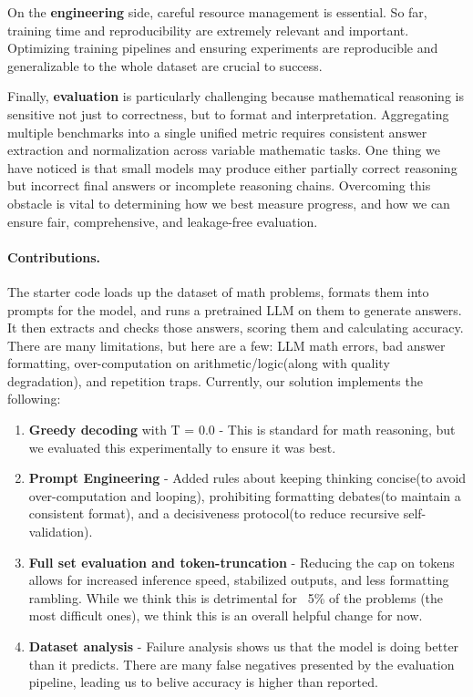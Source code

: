 \documentclass{article}
\begin{document}
On the \textbf{engineering} side, careful resource management is essential. So far, training time and reproducibility are extremely relevant and important. Optimizing training pipelines and ensuring experiments are reproducible and generalizable to the whole dataset are crucial to success.

Finally, \textbf{evaluation} is particularly challenging because mathematical reasoning is sensitive not just to correctness, but to format and interpretation. Aggregating multiple benchmarks into a single unified metric requires consistent answer extraction and normalization across variable mathematic tasks. One thing we have noticed is that small models may produce either partially correct reasoning but incorrect final answers or incomplete reasoning chains. Overcoming this obstacle is vital to determining how we best measure progress, and how we can ensure fair, comprehensive, and leakage-free evaluation.


\paragraph{Contributions.}

The starter code loads up the dataset of math problems, formats them into prompts for the model, and runs a pretrained LLM on them to generate answers. It then extracts and checks those answers, scoring them and calculating accuracy. There are many limitations, but here are a few: LLM math errors, bad answer formatting, over-computation on arithmetic/logic(along with quality degradation), and repetition traps. Currently, our solution implements the following:
\begin{enumerate}
    \item \textbf{Greedy decoding} with T = 0.0 - This is standard for math reasoning, but we evaluated this experimentally to ensure it was best.
    \item \textbf{Prompt Engineering} - Added rules about keeping thinking concise(to avoid over-computation and looping), prohibiting formatting debates(to maintain a consistent format), and a decisiveness protocol(to reduce recursive self-validation).
    \item \textbf{Full set evaluation and token-truncation} - Reducing the cap on tokens allows for increased inference speed, stabilized outputs, and less formatting rambling. While we think this is detrimental for ~5\% of the problems (the most difficult ones), we think this is an overall helpful change for now.
    \item \textbf{Dataset analysis} - Failure analysis shows us that the model is doing better than it predicts. There are many false negatives presented by the evaluation pipeline, leading us to belive accuracy is higher than reported.
\end{enumerate}
\end{document}
